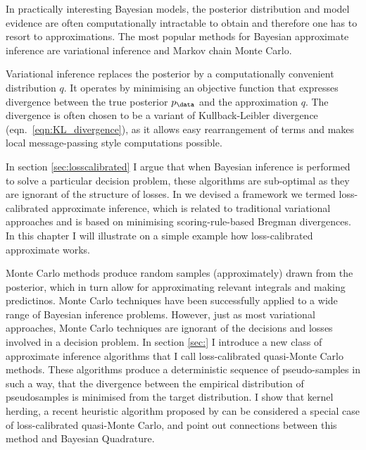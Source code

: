 In practically interesting Bayesian models, the posterior distribution and model evidence are often computationally intractable to obtain and therefore one has to resort to approximations. The most popular methods for Bayesian approximate inference are variational inference and Markov chain Monte Carlo.

Variational inference replaces the posterior by a computationally convenient distribution $q$. It operates by minimising an objective function that expresses divergence between the true posterior $p_\data$ and the approximation $q$. The divergence is often chosen to be a variant of Kullback-Leibler divergence (eqn.\ \eqref{eqn:KL_divergence}), as it allows easy rearrangement of terms and makes local message-passing style computations possible.

In section \ref{sec:losscalibrated} I argue that when Bayesian inference is performed to solve a particular decision problem, these algorithms are sub-optimal as they are ignorant of the structure of losses. In \citep{Lacoste2011} we devised a framework we termed loss-calibrated approximate inference, which is related to traditional variational approaches and is based on minimising scoring-rule-based Bregman divergences. In this chapter I will illustrate on a simple example how loss-calibrated approximate works.

Monte Carlo methods produce random samples (approximately) drawn from the posterior, which in turn allow for approximating relevant integrals and making predictinos. Monte Carlo techniques have been successfully applied to a wide range of Bayesian inference problems. However, just as most variational approaches, Monte Carlo techniques are ignorant of the decisions and losses involved in a decision problem. In section \ref{sec:} I introduce a new class of approximate inference algorithms that I call loss-calibrated quasi-Monte Carlo methods. These algorithms produce a deterministic sequence of pseudo-samples in such a way, that the divergence between the empirical distribution of pseudosamples is minimised from the target distribution. I show that kernel herding, a recent heuristic algorithm proposed by \citet{Chen2012} can be considered a special case of loss-calibrated quasi-Monte Carlo, and point out connections between this method and Bayesian Quadrature.


